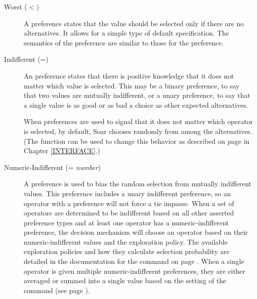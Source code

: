 \begin{description}
\item [Worst ($<$)] A  preference states that the value should be 
selected
        only if there are no alternatives.  It allows for a simple type of
        default specification. The semantics of the  preference
        are similar to those for the  preference.\vspace{-8pt}

\item [Indifferent (=)] An  preference states that there is
        positive knowledge that it does not matter which value is selected.
        This may be a binary preference, to say that two values are mutually
        indifferent, or a unary preference, to say that a single value is as
        good or as bad a choice as other expected alternatives.
        
	When  preferences are used to signal that it does
	not matter which operator is selected, by default, Soar
	chooses randomly from among the alternatives. (The
	 function can be used to change this
	behavior as described on
	page \pageref{indifferent-selection} in Chapter
	\ref{INTERFACE}.)\vspace{-8pt}

\item [Numeric-Indifferent (= \emph{number})]
	A  preference is used to bias the random selection
	from mutually indifferent values. This preference includes a unary
	indifferent preference, so an operator with a 
	preference will not force a tie impasse. When a set of operators are
	determined to be indifferent based on all other asserted preference types
	and at least one operator has a numeric-indifferent preference, the decision
	mechanism will choose an operator based on their numeric-indifferent values
	and the exploration policy. The available exploration policies and how they
	calculate selection probability are detailed in the documentation for the
	 command on page
	\pageref{indifferent-selection}. When a single operator is given multiple
	numeric-indifferent preferences, they are either averaged or summed into a
	single value based on the setting of the 
	command (see page \pageref{numeric-indifferent-mode}).


\end{description}
